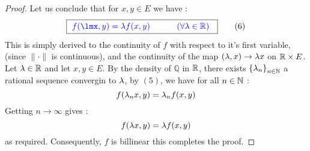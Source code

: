 \begin{proof}
Let us conclude that for $x,y \in  E$ we have : 
\[
  \fbox{
    \textcolor{blue}{
    $ 
f(\lmx, y) = \lm f(x,y)  
  \quad \quad \quad \left( \forall \lm \in  \mathbb{R} \right)
    $ 
    }
  } \quad \quad  (6) 
\]
This is simply derived to the continuity of $f $ with respect to it's first variable, 
(since $\| \cdot  \|  $ is continuous), and the continuity of the map
$(\lambda,x) \rightarrow \lambda x  $ on $\mathbb{R}  \times E  $. Let $\lambda \in  \mathbb{R}  $ and 
let $x,y \in  E $. By the density of $\mathbb{Q} $ in $\mathbb{R}  $, there exists 
$\left\{ \lambda_{n} \right\}_{n \in  \mathbb{N}} $  a rational sequence convergin to $\lambda $, 
by $(5)$, we have for all $n \in  \mathbb{N} $ :
\[
f (\lambda _{n} x, y )  = \lambda_n f(x,y) 
\]
Getting $n \rightarrow  \infty $ gives : 
\[
f(\lambda x, y)  = 
\lambda f(x,y) 
\]
as required. Consequently, $f $ is billinear 
this completes the proof.
\end{proof}
% 
